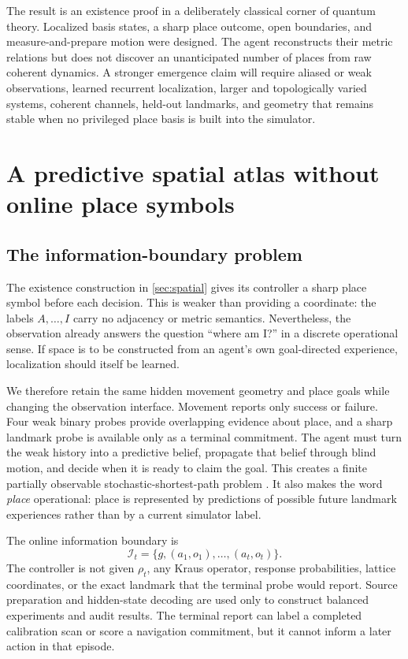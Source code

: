 \documentclass[11pt]{article}
\begin{document}
The result is an existence proof in a deliberately classical corner of quantum
theory. Localized basis states, a sharp place outcome, open boundaries, and
measure-and-prepare motion were designed. The agent reconstructs their metric
relations but does not discover an unanticipated number of places from raw
coherent dynamics. A stronger emergence claim will require aliased or weak
observations, learned recurrent localization, larger and topologically varied
systems, coherent channels, held-out landmarks, and geometry that remains
stable when no privileged place basis is built into the simulator.

\section{A predictive spatial atlas without online place symbols}
\label{sec:predictive-atlas}

\subsection{The information-boundary problem}

The existence construction in \cref{sec:spatial} gives its controller a sharp
place symbol before each decision. This is weaker than providing a coordinate:
the labels $A,\ldots,I$ carry no adjacency or metric semantics. Nevertheless,
the observation already answers the question ``where am I?'' in a discrete
operational sense. If space is to be constructed from an agent's own
goal-directed experience, localization should itself be learned.

We therefore retain the same hidden movement geometry and place goals while
changing the observation interface. Movement reports only success or failure.
Four weak binary probes provide overlapping evidence about place, and a sharp
landmark probe is available only as a terminal commitment. The agent must turn
the weak history into a predictive belief, propagate that belief through blind
motion, and decide when it is ready to claim the goal. This creates a finite
partially observable stochastic-shortest-path problem
\cite{kaelbling1998}. It also makes the word \emph{place} operational: place is
represented by predictions of possible future landmark experiences rather
than by a current simulator label.

The online information boundary is
\begin{equation}
 \mathcal I_t=\{g,(a_1,o_1),\ldots,(a_t,o_t)\}.
 \label{eq:atlas-information}
\end{equation}
The controller is not given $\rho_t$, any Kraus operator, response
probabilities, lattice coordinates, or the exact landmark that the terminal
probe would report. Source preparation and hidden-state decoding are used only
to construct balanced experiments and audit results. The terminal report can
label a completed calibration scan or score a navigation commitment, but it
cannot inform a later action in that episode.
\end{document}
